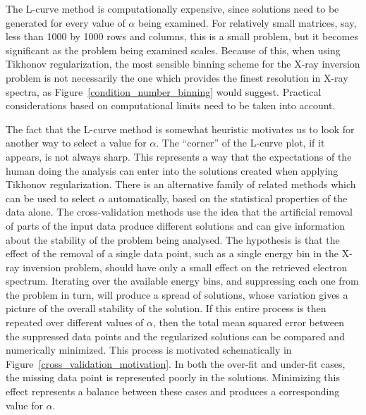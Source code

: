 The L-curve method is computationally expensive, since solutions need to be generated for every value of $\alpha$ being examined. For relatively small matrices, say, less than 1000 by 1000 rows and columns, this is a small problem, but it becomes significant as the problem being examined scales. Because of this, when using Tikhonov regularization, the most sensible binning scheme for the X-ray inversion problem is not necessarily the one which provides the finest resolution in X-ray spectra, as Figure~\ref{condition_number_binning} would suggest. Practical considerations based on computational limits need to be taken into account. 

The fact that the L-curve method is somewhat heuristic motivates us to look for another way to select a value for $\alpha$. The ``corner'' of the L-curve plot, if it appears, is not always sharp. This represents a way that the expectations of the human doing the analysis can enter into the solutions created when applying Tikhonov regularization. There is an alternative family of related methods which can be used to select $\alpha$ automatically, based on the statistical properties of the data alone. The cross-validation methods use the idea that the artificial removal of parts of the input data produce different solutions and can give information about the stability of the problem being analysed. The hypothesis is that the effect of the removal of a single data point, such as a single energy bin in the X-ray inversion problem, should have only a small effect on the retrieved electron spectrum. Iterating over the available energy bins, and suppressing each one from the problem in turn, will produce a spread of solutions, whose variation gives a picture of the overall stability of the solution. If this entire process is then repeated over different values of $\alpha$, then the total mean squared error between the suppressed data points and the regularized solutions can be compared and numerically minimized. This process is motivated schematically in Figure~\ref{cross_validation_motivation}. In both the over-fit and under-fit cases, the missing data point is represented poorly in the solutions. Minimizing this effect represents a balance between these cases and produces a corresponding value for $\alpha$. 

